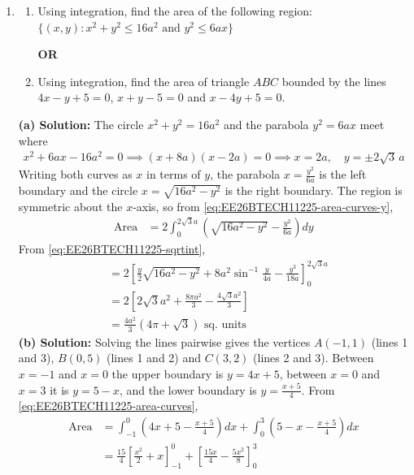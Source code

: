 \begin{enumerate}[label=\thesubsection.\arabic*, ref=\thesubsection.\theenumi]
    \item
    \begin{enumerate}[label=(\alph*), leftmargin=1.5em, labelsep=0.5em]
        \item Using integration, find the area of the following region: $\{(x,y) : x^2+y^2\leq 16a^2 \text{ and } y^2\leq 6ax\}$

        \begin{center}
            \textbf{OR}
        \end{center}

        \item Using integration, find the area of triangle $ABC$ bounded by the lines $4x-y+5=0$, $x+y-5=0$ and $x-4y+5=0$.
    \end{enumerate} \vspace{2pt}
    \textbf{(a) Solution:} The circle $x^2+y^2=16a^2$ and the parabola $y^2=6ax$ meet where
\begin{align}
    x^2+6ax-16a^2 = 0 \implies (x+8a)(x-2a) = 0 \implies x = 2a, \quad y = \pm 2\sqrt{3}\,a
\end{align}
Writing both curves as $x$ in terms of $y$, the parabola $x = \frac{y^2}{6a}$ is the left boundary and the circle $x = \sqrt{16a^2-y^2}$ is the right boundary. The region is symmetric about the $x$-axis, so from \eqref{eq:EE26BTECH11225-area-curves-y},
\begin{align}
    \text{Area} &= 2\int_0^{2\sqrt{3}a}\left(\sqrt{16a^2-y^2}-\frac{y^2}{6a}\right)dy
\end{align}
From \eqref{eq:EE26BTECH11225-sqrtint},
\begin{align}
    &= 2\left[\frac{y}{2}\sqrt{16a^2-y^2}+8a^2\sin^{-1}\frac{y}{4a}-\frac{y^3}{18a}\right]_0^{2\sqrt{3}a} \\
    &= 2\left[2\sqrt{3}a^2+\frac{8\pi a^2}{3}-\frac{4\sqrt{3}a^2}{3}\right] \\
    &= \frac{4a^2}{3}\left(4\pi+\sqrt{3}\right)\text{ sq. units}
\end{align}
\textbf{(b) Solution:} Solving the lines pairwise gives the vertices $A(-1,1)$ (lines 1 and 3), $B(0,5)$ (lines 1 and 2) and $C(3,2)$ (lines 2 and 3). Between $x=-1$ and $x=0$ the upper boundary is $y=4x+5$, between $x=0$ and $x=3$ it is $y=5-x$, and the lower boundary is $y=\frac{x+5}{4}$. From \eqref{eq:EE26BTECH11225-area-curves},
\begin{align}
    \text{Area} &= \int_{-1}^{0}\left(4x+5-\frac{x+5}{4}\right)dx + \int_{0}^{3}\left(5-x-\frac{x+5}{4}\right)dx \\
    &= \frac{15}{4}\left[\frac{x^2}{2}+x\right]_{-1}^{0} + \left[\frac{15x}{4}-\frac{5x^2}{8}\right]_0^3 \\

\end{align}
\end{enumerate}

